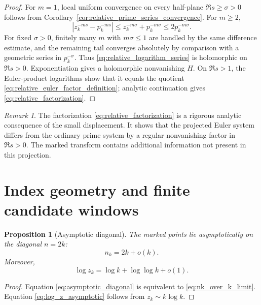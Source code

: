 \documentclass[11pt]{amsart}
\numberwithin{equation}{section}
\theoremstyle{plain}
\newtheorem{proposition}[theorem]{Proposition}
\theoremstyle{definition}
\theoremstyle{remark}
\newtheorem{remark}[theorem]{Remark}
\begin{document}
\begin{proof}
For $m=1$, local uniform convergence on every half-plane
$\Re s\geq\sigma>0$ follows from
Corollary~\ref{cor:relative_prime_series_convergence}.  For $m\geq2$,
\begin{equation}
 |z_k^{-ms}-p_k^{-ms}|
 \leq z_k^{-m\sigma}+p_k^{-m\sigma}
 \leq2p_k^{-m\sigma}.
 \label{eq:higher_m_majorant}
\end{equation}
For fixed $\sigma>0$, finitely many $m$ with $m\sigma\leq1$ are handled by
the same difference estimate, and the remaining tail converges absolutely by
comparison with a geometric series in $p_k^{-\sigma}$.  Thus
\eqref{eq:relative_logarithm_series} is holomorphic on $\Re s>0$.
Exponentiation gives a holomorphic nonvanishing $H$.  On $\Re s>1$, the
Euler-product logarithms show that it equals the quotient
\eqref{eq:relative_euler_factor_definition}; analytic continuation gives
\eqref{eq:relative_factorization}.
\end{proof}

\begin{remark}
\label{rem:relative_factorization_meaning}
The factorization \eqref{eq:relative_factorization} is a rigorous analytic
consequence of the small displacement.  It shows that the projected Euler
system differs from the ordinary prime system by a regular nonvanishing
factor in $\Re s>0$.  The marked transform contains additional information
not present in this projection.
\end{remark}

\section{Index geometry and finite candidate windows}
\label{sec:index_geometry}

\begin{proposition}[Asymptotic diagonal]
\label{prop:asymptotic_diagonal}
The marked points lie asymptotically on the diagonal $n=2k$:
\begin{equation}
 n_k=2k+o(k).
 \label{eq:asymptotic_diagonal}
\end{equation}
Moreover,
\begin{equation}
 \log z_k=\log k+\log\log k+o(1).
 \label{eq:log_z_asymptotic}
\end{equation}
\end{proposition}

\begin{proof}
Equation \eqref{eq:asymptotic_diagonal} is equivalent to
\eqref{eq:nk_over_k_limit}.  Equation \eqref{eq:log_z_asymptotic} follows
from $z_k\sim k\log k$.
\end{proof}
\end{document}
